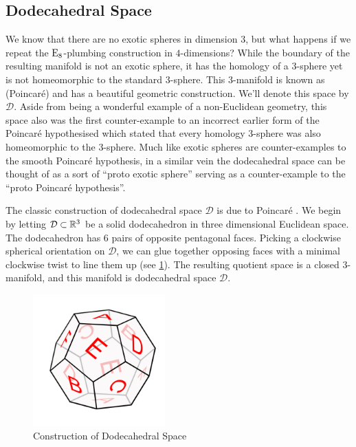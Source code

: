 \pagebreak
\subsection*{Dodecahedral Space}

We know that there are no exotic spheres in dimension $3$, but what happens if we repeat the ${\operatorname{E}}_8$-plumbing construction in $4$-dimensions? While the boundary of the resulting manifold is not an exotic sphere, it has the homology of a $3$-sphere yet is not homeomorphic to the standard $3$-sphere.
This $3$-manifold is known as (Poincar\'e)  and has a beautiful geometric construction. We'll denote this space by $\mathscr{D}$. Aside from being a wonderful example of a non-Euclidean geometry, this space also was the first counter-example to an incorrect earlier form of the Poincar\'e hypothesised which stated that every homology $3$-sphere was also homeomorphic to the $3$-sphere. Much like exotic spheres are counter-examples to the smooth Poincar\'e hypothesis, in a similar vein the dodecahedral space can be thought of as a sort of ``proto exotic sphere'' serving as a counter-example to the ``proto Poincar\'e hypothesis''.

The classic construction of dodecahedral space $\mathscr{D}$ is due to Poincar\'e . We begin by letting $\mathcal{D}\subset \mathbb{R}^3$ be a solid dodecahedron in three dimensional Euclidean space. The dodecahedron has 6 pairs of opposite pentagonal faces. Picking a clockwise spherical orientation on $\mathcal{D}$, we can glue together opposing faces with a minimal clockwise twist to line them up (see \cref{fig:dodecahedral_space_construction}). The resulting quotient space is a closed $3$-manifold, and this manifold is dodecahedral space $\mathscr{D}$.

\begin{figure}[ht]
	\centering
	\includegraphics[width=2in]{graphics/temp-diagrams/dodecahedral-space-geometric-construction.png}
	\caption{Construction of Dodecahedral Space}\label{fig:dodecahedral_space_construction}
\end{figure}

